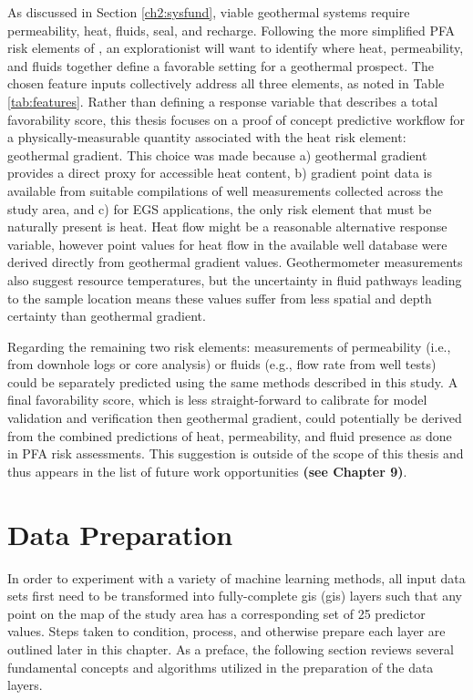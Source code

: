 As discussed in Section \ref{ch2:sysfund}, viable geothermal systems require permeability, heat, fluids, seal, and recharge. Following the more simplified PFA risk elements of \citet{bielicki_hydrogeolgic_2015}, an explorationist will want to identify where heat, permeability, and fluids together define a favorable setting for a geothermal prospect. The chosen feature inputs collectively address all three elements, as noted in Table \ref{tab:features}. Rather than defining a response variable that describes a total favorability score, this thesis focuses on a proof of concept predictive workflow for a physically-measurable quantity associated with the heat risk element: geothermal gradient. This choice was made because a) geothermal gradient provides a direct proxy for accessible heat content, b) gradient point data is available from suitable compilations of well measurements collected across the study area, and c) for EGS applications, the only risk element that must be naturally present is heat. Heat flow might be a reasonable alternative response variable, however point values for heat flow in the available well database were derived directly from geothermal gradient values. Geothermometer measurements also suggest resource temperatures, but the uncertainty in fluid pathways leading to the sample location means these values suffer from less spatial and depth certainty than geothermal gradient.

Regarding the remaining two risk elements: measurements of permeability (i.e., from downhole logs or core analysis) or fluids (e.g., flow rate from well tests) could be separately predicted using the same methods described in this study. A final favorability score, which is less straight-forward to calibrate for model validation and verification then geothermal gradient, could potentially be derived from the combined predictions of heat, permeability, and fluid presence as done in PFA risk assessments. This suggestion is outside of the scope of this thesis and thus appears in the list of future work opportunities \textbf{(see Chapter 9)}.

\section{Data Preparation}

In order to experiment with a variety of machine learning methods, all input data sets first need to be transformed into fully-complete \acrlong{gis} (\acrshort{gis}) layers such that any point on the map of the study area has a corresponding set of 25 predictor values. Steps taken to condition, process, and otherwise prepare each layer are outlined later in this chapter. As a preface, the following section reviews several fundamental concepts and algorithms utilized in the preparation of the data layers.

